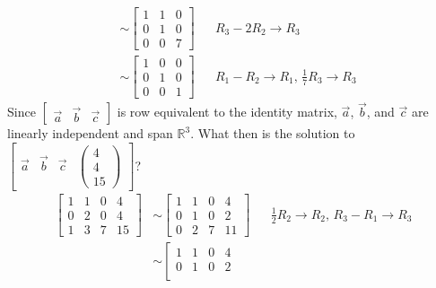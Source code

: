 \documentclass[10pt,letterpaper,final]{report}
\newcommand{\reason}[1]{&& \text{#1}}
\begin{document}
\begin{enumerate}[label=(\alph*)]
\begin{align*}
           & \sim \begin{bmatrix}
                    1 & 1 & 0 \\
                    0 & 1 & 0 \\
                    0 & 0 & 7
                  \end{bmatrix} \reason{$R_3 - 2R_2 \to R_3$}                          \\[1ex]
           & \sim \begin{bmatrix}
                    1 & 0 & 0 \\
                    0 & 1 & 0 \\
                    0 & 0 & 1
                  \end{bmatrix} \reason{$R_1 - R_2 \to R_1$, $\frac{1}{7}R_3 \to R_3$}
        \end{align*}
        Since $\begin{bmatrix}\vec{a} & \vec{b} & \vec{c}\end{bmatrix}$ is row equivalent to the identity matrix, $\vec{a}$, $\vec{b}$, and $\vec{c}$ are linearly independent and span $\mathbb{R}^3$. What then is the solution to $\left[\begin{array}{ccc|c} \vec{a} & \vec{b} & \vec{c} & \begin{pmatrix}4\\4\\15\end{pmatrix} \end{array}\right]$?
        \begin{align*}
          \left[\begin{array}{rrr|r}
              1 & 1 & 0 & 4  \\
              0 & 2 & 0 & 4  \\
              1 & 3 & 7 & 15
            \end{array}\right]
           & \sim \left[\begin{array}{rrr|r}
                      1 & 1 & 0 & 4  \\
                      0 & 1 & 0 & 2  \\
                      0 & 2 & 7 & 11
                    \end{array}\right] \reason{$\frac{1}{2}R_2 \to R_2$, $R_3 - R_1 \to R_3$} \\[1ex]
           & \sim \left[\begin{array}{rrr|r}
                      1 & 1 & 0 & 4 \\
                      0 & 1 & 0 & 2 \\

\end{array}
\end{align*}
\end{enumerate}
\end{document}
